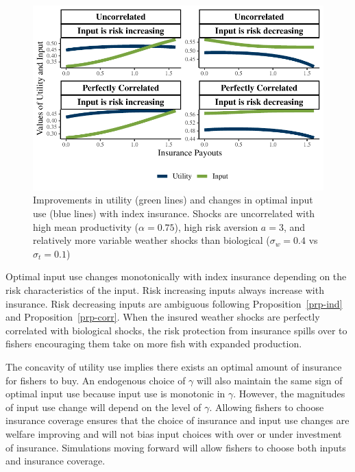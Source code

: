 \documentclass[
  letterpaper,
  DIV=11,
  numbers=noendperiod]{scrartcl}
\theoremstyle{plain}
\theoremstyle{plain}
\theoremstyle{remark}
\begin{document}
\begin{figure}

{\centering \includegraphics{ibi-behavior_files/figure-pdf/fig-iter-1.pdf}

}

\caption{\label{fig-iter}Improvements in utility (green lines) and
changes in optimal input use (blue lines) with index insurance. Shocks
are uncorrelated with high mean productivity (\(\alpha=0.75\)), high
risk aversion \(a=3\), and relatively more variable weather shocks than
biological (\(\sigma_{w}=0.4\) vs \(\sigma_{t}=0.1\))}

\end{figure}

Optimal input use changes monotonically with index insurance depending
on the risk characteristics of the input. Risk increasing inputs always
increase with insurance. Risk decreasing inputs are ambiguous following
Proposition~\ref{prp-ind} and Proposition~\ref{prp-corr}. When the
insured weather shocks are perfectly correlated with biological shocks,
the risk protection from insurance spills over to fishers encouraging
them take on more fish with expanded production.

The concavity of utility use implies there exists an optimal amount of
insurance for fishers to buy. An endogenous choice of \(\gamma\) will
also maintain the same sign of optimal input use because input use is
monotonic in \(\gamma\). However, the magnitudes of input use change
will depend on the level of \(\gamma\). Allowing fishers to choose
insurance coverage ensures that the choice of insurance and input use
changes are welfare improving and will not bias input choices with over
or under investment of insurance. Simulations moving forward will allow
fishers to choose both inputs and insurance coverage.
\end{document}
